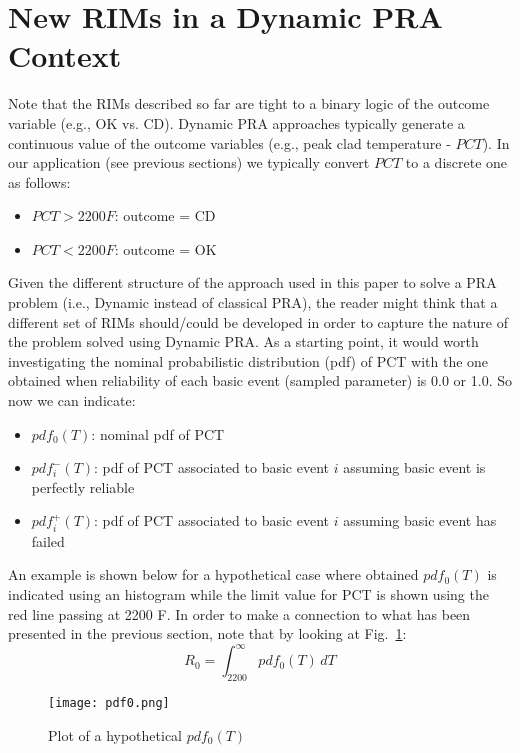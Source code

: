 \section{New RIMs in a Dynamic PRA Context}
\label{sec:newRIM}

Note that the RIMs described so far are tight to a binary logic of the outcome 
variable (e.g., OK vs. CD). Dynamic PRA approaches typically generate a continuous 
value of the outcome variables (e.g., peak clad temperature - $PCT$). 
In our application (see previous sections) we typically convert $PCT$ to a discrete 
one as follows:
\begin{itemize}
  \item $PCT>2200 F$: outcome = CD
  \item $PCT<2200 F$: outcome = OK
\end{itemize}
  
Given the different structure of the approach used in this paper to solve a PRA 
problem (i.e., Dynamic instead of classical PRA), the reader might think that a different 
set of RIMs should/could be developed in order to capture the nature of the problem 
solved using Dynamic PRA.
As a starting point, it would worth investigating the nominal probabilistic distribution 
(pdf) of PCT with the one obtained when reliability of each basic event (sampled parameter) 
is 0.0 or 1.0. So now we can indicate:
\begin{itemize}
  \item $pdf_0 (T)$: nominal pdf of PCT
  \item $pdf_i^-(T)$: pdf of PCT associated to basic event $i$ assuming basic event is perfectly 
        reliable
  \item $pdf_i^+(T)$: pdf of PCT associated to basic event $i$ assuming basic event has failed
\end{itemize}

An example is shown below for a hypothetical case where obtained $pdf_0(T)$ is indicated 
using an histogram while the limit value for PCT is shown using the red line passing at 2200 F.
In order to make a connection to what has been presented in the previous section, note that by 
looking at Fig.~\ref{fig:pdf0}:
\begin{equation}
  R_0 = \int_{2200}^\infty \! pdf_0(T) \, dT
  \label{eq:R0}
\end{equation}

\begin{figure}
    \centering
    \centerline{\texttt{[image: pdf0.png]}}
    \caption{Plot of a hypothetical $pdf_0(T)$}
    \label{fig:pdf0}
\end{figure}


